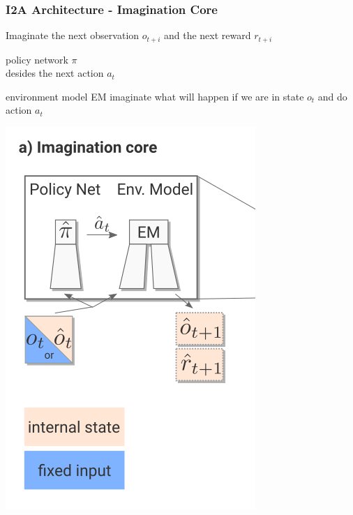 \begin{frame}
    \frametitle{I2A Architecture - Imagination Core}

\begin{multicols}{2}
	\begin{PraesentationAufzaehlung}
	    \item Imaginate the next observation $o_{t+i}$ and the next reward $r_{t+i}$
		\item policy network $\pi$\\
		desides the next action $a_t$
		\item environment model EM imaginate what will happen if we are in state $o_t$ and do action $a_t$
	\end{PraesentationAufzaehlung}
    \vfill\columnbreak
    \includegraphics[height=0.7\textheight]{./Images/Imagination_core.png}%
\end{multicols}
    
\end{frame}
\clearpage





